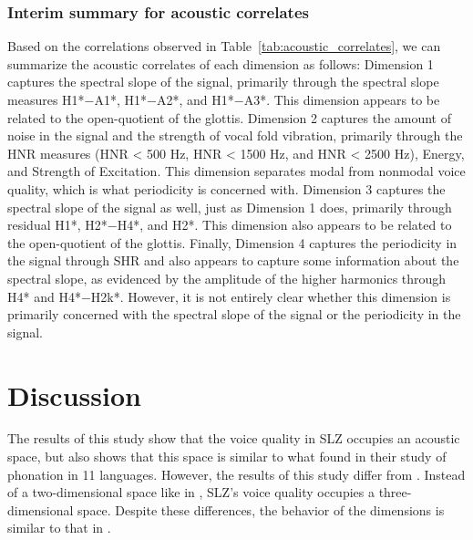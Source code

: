 \subsubsection{Interim summary for acoustic correlates} \label{sec:acousticlandscape:interim_correlates}

Based on the correlations observed in Table~\ref{tab:acoustic_correlates}, we can summarize the acoustic correlates of each dimension as follows: Dimension 1 captures the spectral slope of the signal, primarily through the spectral slope measures H1*$-$A1*, H1*$-$A2*, and H1*$-$A3*. This dimension appears to be related to the open-quotient of the glottis. Dimension 2 captures the amount of noise in the signal and the strength of vocal fold vibration, primarily through the HNR measures (HNR < 500 Hz, HNR < 1500 Hz, and HNR < 2500 Hz), Energy, and Strength of Excitation. This dimension separates modal from nonmodal voice quality, which is what periodicity is concerned with. Dimension 3 captures the spectral slope of the signal as well, just as Dimension 1 does, primarily through residual H1*, H2*$-$H4*, and H2*. This dimension also appears to be related to the open-quotient of the glottis. Finally, Dimension 4 captures the periodicity in the signal through SHR and also appears to capture some information about the spectral slope, as evidenced by the amplitude of the higher harmonics through H4* and H4*$-$H2k*. However, it is not entirely clear whether this dimension is primarily concerned with the spectral slope of the signal or the periodicity in the signal.

\section{Discussion} \label{sec:acousticlandscape:discussion}

The results of this study show that the voice quality in SLZ occupies an acoustic space, but also shows that this space is similar to what \citet{keatingCrosslanguageAcousticSpace2023} found in their study of phonation in 11 languages. However, the results of this study differ from \citet{keatingCrosslanguageAcousticSpace2023}. Instead of a two-dimensional space like in \citet{keatingCrosslanguageAcousticSpace2023}, SLZ's voice quality occupies a three-dimensional space. Despite these differences, the behavior of the dimensions is similar to that in \citet{keatingCrosslanguageAcousticSpace2023}. 

